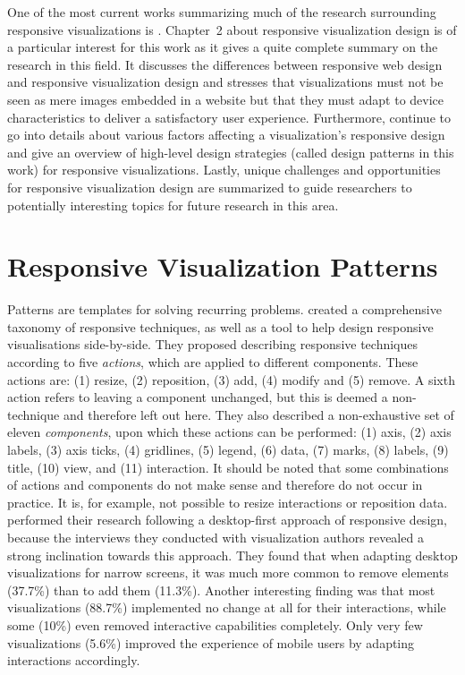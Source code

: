 One of the most current works summarizing much of the research
surrounding responsive visualizations is
\textcite{Lee-2021-Mobile-Vis}. Chapter~2 about responsive
visualization design \parencite{Horak-2021-Responsive-Vis} is of a
particular interest for this work as it gives a quite complete summary
on the research in this field. It discusses the differences between
responsive web design and responsive visualization design and stresses
that visualizations must not be seen as mere images embedded in a
website but that they must adapt to device characteristics to deliver
a satisfactory user experience. Furthermore,
\textcite{Horak-2021-Responsive-Vis} continue to go into details about
various factors affecting a visualization's responsive design and give
an overview of high-level design strategies (called design patterns in
this work) for responsive visualizations. Lastly, unique challenges
and opportunities for responsive visualization design are summarized
to guide researchers to potentially interesting topics for future
research in this area.


\section{Responsive Visualization Patterns}

Patterns are templates for solving recurring problems.
\textcite{TechniquesForFlexibleRespVisDesign} created a comprehensive
taxonomy of responsive techniques, as well as a tool to help design
responsive visualisations side-by-side. They proposed describing
responsive techniques according to five \emph{actions}, which are
applied to different components. These actions are: (1) resize, (2)
reposition, (3) add, (4) modify and (5) remove. A sixth action refers
to leaving a component unchanged, but this is deemed a non-technique
and therefore left out here. They also described a non-exhaustive set
of eleven \emph{components}, upon which these actions can be
performed: (1) axis, (2) axis labels, (3) axis ticks, (4) gridlines,
(5) legend, (6) data, (7) marks, (8) labels, (9) title, (10) view, and
(11) interaction. It should be noted that some combinations of actions
and components do not make sense and therefore do not occur in
practice. It is, for example, not possible to resize interactions or
reposition data.  \textcite{TechniquesForFlexibleRespVisDesign}
performed their research following a desktop-first approach of
responsive design, because the interviews they conducted with
visualization authors revealed a strong inclination towards this
approach. They found that when adapting desktop visualizations for
narrow screens, it was much more common to remove elements (37.7\%)
than to add them (11.3\%). Another interesting finding was that most
visualizations (88.7\%) implemented no change at all for their
interactions, while some (10\%) even removed interactive capabilities
completely. Only very few visualizations (5.6\%) improved the
experience of mobile users by adapting interactions accordingly.



